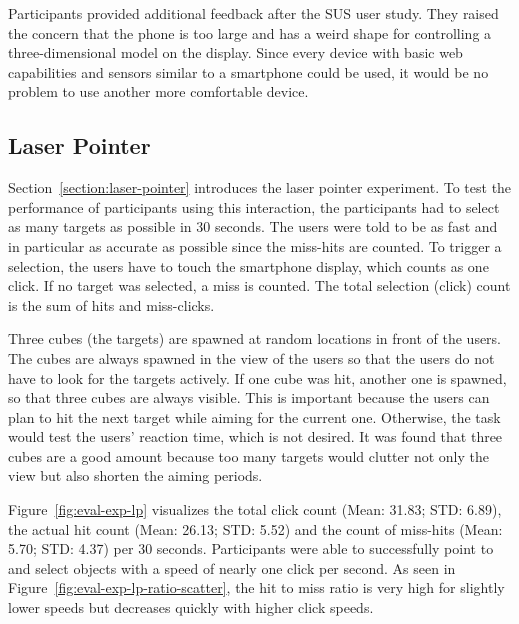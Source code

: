 Participants provided additional feedback after the \gls{SUS} user study. They raised the concern that the phone is too large and has a weird shape for controlling a three-dimensional model on the display. Since every device with basic web capabilities and sensors similar to a smartphone could be used, it would be no problem to use another more comfortable device. 


\subsection{Laser Pointer}\label{section:eval-res-lp}

Section~\ref{section:laser-pointer} introduces the laser pointer experiment. To test the performance of participants using this interaction, the participants had to select as many targets as possible in 30 seconds. The users were told to be as fast and in particular as accurate as possible since the miss-hits are counted. To trigger a selection, the users have to touch the smartphone display, which counts as one click. If no target was selected, a miss is counted. The total selection (click) count is the sum of hits and miss-clicks.

Three cubes (the targets) are spawned at random locations in front of the users. The cubes are always spawned in the view of the users so that the users do not have to look for the targets actively. 
If one cube was hit, another one is spawned, so that three cubes are always visible. This is important because the users can plan to hit the next target while aiming for the current one. Otherwise, the task would test the users' reaction time, which is not desired. It was found that three cubes are a good amount because too many targets would clutter not only the view but also shorten the aiming periods.

Figure~\ref{fig:eval-exp-lp} visualizes the total click count (Mean: 31.83; \gls{STD}: 6.89), the actual hit count (Mean: 26.13; \gls{STD}: 5.52) and the count of miss-hits (Mean: 5.70; \gls{STD}: 4.37) per 30 seconds. Participants were able to successfully point to and select objects with a speed of nearly one click per second. As seen in Figure~\ref{fig:eval-exp-lp-ratio-scatter}, the hit to miss ratio is very high for slightly lower speeds but decreases quickly with higher click speeds.

